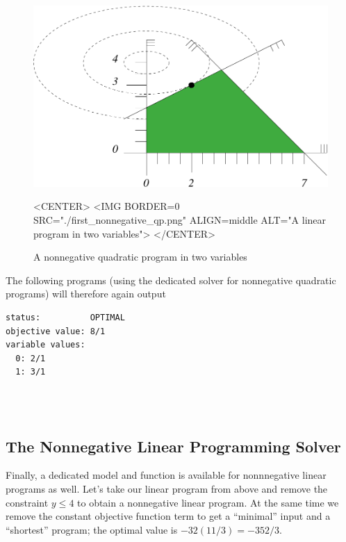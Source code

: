 \begin{figure}[htbp]
\begin{ccTexOnly}
\begin{center}
\includegraphics{QP_solver/first_nonnegative_qp} 
\end{center}
\end{ccTexOnly}

\begin{ccHtmlOnly}
<CENTER>
<IMG BORDER=0 SRC="./first_nonnegative_qp.png" ALIGN=middle ALT="A linear program in two variables">
</CENTER>
\end{ccHtmlOnly}

\caption{A nonnegative quadratic program in two variables
\label{fig:QP-first_nonnegative_qp}}
\end{figure}

The following programs (using the dedicated solver for nonnegative
quadratic programs) will therefore again output
\begin{verbatim}
status:          OPTIMAL
objective value: 8/1
variable values:
  0: 2/1
  1: 3/1
\end{verbatim}

\\
\\

\subsection{The Nonnegative Linear Programming Solver}
Finally, a dedicated model and function is available for nonnnegative linear
programs as well. Let's take our linear program from above and remove
the constraint $y\leq 4$ to obtain a nonnegative linear program. At
the same time we remove the constant objective function term to get
a ``minimal'' input and a ``shortest'' program; the optimal value is
$-32(11/3)=-352/3$.

